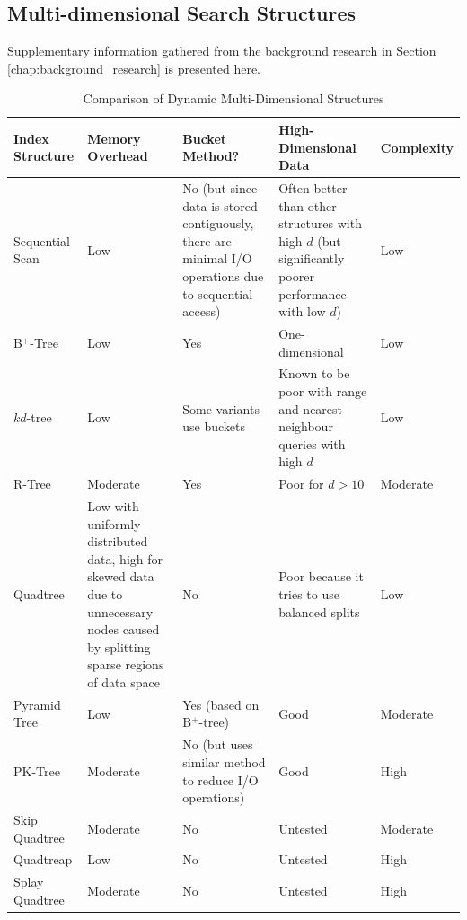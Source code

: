 \begin{landscape}
	\section{Multi-dimensional Search Structures}

	Supplementary information gathered from the background research in Section \ref{chap:background_research} is presented here.

	\begin{table}[h]
		\centering
		\begin{tabular}{|p{2.8cm}|p{5cm}|p{5cm}|p{5cm}|p{2cm}|}
			\hline
			\textbf{Index Structure} &
			\textbf{Memory Overhead} &
			\textbf{Bucket Method?} &
			\textbf{High-Dimensional Data} &
			\textbf{Complexity} \\
			\hline
			Sequential Scan & Low & No (but since data is stored contiguously, there are minimal I/O operations due to sequential access) & Often better than other structures with high $d$ (but significantly poorer performance with low $d$) & Low \\		
			B${}^{+}$-Tree & Low & Yes & One-dimensional & Low \\
			$kd$-tree & Low & Some variants use buckets & Known to be poor with range and nearest neighbour queries with high $d$ \cite{similarity-searching} & Low \\
			R-Tree & Moderate & Yes & Poor for $d > 10$ \cite{pyramid-tree} & Moderate \\
			Quadtree & Low with uniformly distributed data, high for skewed data due to unnecessary nodes caused by splitting sparse regions of data space & No & Poor because it tries to use balanced splits \cite{pyramid-tree} & Low \\
			Pyramid Tree & Low & Yes (based on B${}^{+}$-tree) & Good & Moderate \\
			PK-Tree & Moderate & No (but uses similar method to reduce I/O operations) & Good & High \\
			Skip Quadtree & Moderate & No & Untested & Moderate \\
			Quadtreap & Low & No & Untested & High \\
			Splay Quadtree & Moderate & No & Untested & High \\
			\hline
		\end{tabular}
		\caption{Comparison of Dynamic Multi-Dimensional Structures}
		\label{tab:comparison}
	\end{table}


\end{landscape}
